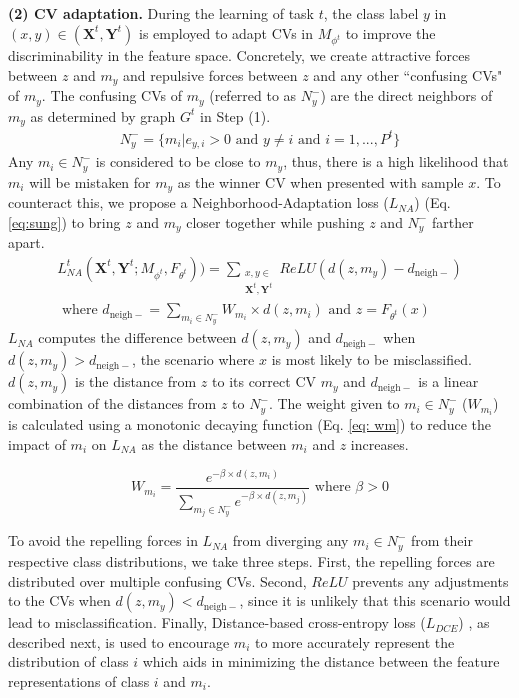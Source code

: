 \documentclass[10pt,twocolumn,letterpaper]{article}
\begin{document}
\textbf{ (2) CV adaptation.} During the learning of task $t$, the class label $y$ in $(x,y) \in (\mathbf{X}^t, \mathbf{Y}^t)$ is employed to adapt CVs in  {$M_{\phi^{t}}$} to improve the discriminability in the feature space. Concretely, we create attractive forces between $z$ and $m_y$ and repulsive forces between $z$ and any other ``confusing CVs" of $m_y$. The confusing CVs of $m_y$ (referred to as $N_{y}^-$) are the direct neighbors of $m_y$ as determined by graph $G^t$ in Step (1). 
\begin{align}
N_{y}^-= \{ m_i |e_{y,i}>0 \text{ and } y \neq i \text{ and } i= 1,...,P^t \} 
\end{align}
Any $m_i \in N_{y}^-$ is considered to be close to $m_y$, thus, there is a high likelihood that $m_i$ will be mistaken for $m_y$ as the winner CV when presented with sample $x$. To counteract this, we propose a Neighborhood-Adaptation loss ($L_{NA}$) (Eq. \ref{eq:sung}) to bring $z$ and $m_y$ closer together while pushing $z$ and $N_{y}^-$ farther apart. 
\begin{align}
L_{NA}^t(\mathbf{X}^t,\mathbf{Y}^t; M_{\phi^t},F_{\theta^t}))=\sum_{\substack{{x,y} \in \\ \mathbf{X}^t,\mathbf{Y}^t}} ReLU(d(z, m_y)-d_{\mathrm{neigh}-})  \nonumber \\ 
\text{ where } d_{\mathrm{neigh}-} = \sum_{m_i \in N_{y}^- }^{}W_{m_i} \times d(z,m_i) \text{ and } z=F_{\theta^t}(x)
\label{eq:sung}
\end{align}
$L_{NA}$ computes the difference between $d(z,m_y)$ and $d_{\mathrm{neigh}-}$ when $d(z,m_y) > d_{\mathrm{neigh}-}$, the scenario where $x$ is most likely to be misclassified.
$d(z,m_y)$ is the distance from $z$ to its correct CV $m_y$ and $d_{\mathrm{neigh}-}$ is a linear combination of the distances from $z$ to $N_{y}^-$. The weight given to $m_i \in N_{y}^-$ ($W_{m_i}$) is calculated using a monotonic decaying function (Eq. \ref{eq: wm}) to reduce the impact of $m_i$ on $L_{NA}$ as the distance between $m_i$ and $z$ increases. 

 \begin{equation}
W_{m_i} = \frac{e^{-\beta \times d(z,m_i)}}{\sum_{m_j \in N_{y}^-}^{}e^{-\beta \times d(z,m_j)}} \text{ where } \beta >0 
\label{eq: wm}
\end{equation}

To avoid the repelling forces in $L_{NA}$ from diverging any $m_i \in N_{y}^-$ from their respective class distributions, we take three steps. First, the repelling forces are distributed over multiple confusing CVs. Second, $ReLU$ prevents any adjustments to the CVs when $d(z,m_y) < d_{\mathrm{neigh}-}$, since it is unlikely that this scenario would lead to misclassification. Finally, Distance-based cross-entropy loss ($L_{DCE}$) \cite{Yang2018RobustLearning}, as described next, is used to encourage $m_i$ to more accurately represent the distribution of class $i$ which aids in minimizing the distance between the feature representations of class $i$ and $m_i$. 
\end{document}
